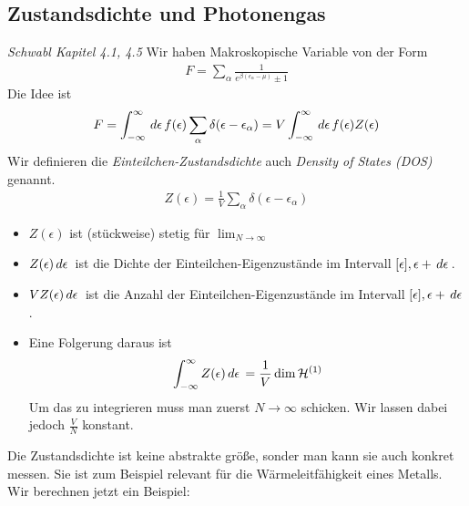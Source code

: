 \subsection*{Zustandsdichte und Photonengas}
\emph{Schwabl Kapitel 4.1, 4.5}
Wir haben Makroskopische Variable von der Form
%
\begin{align*}
  F = \sum_{\alpha}^{} 
  \frac{1}{e^{\beta(\epsilon_\alpha - \mu)} \pm 1}
\end{align*}
%
Die Idee ist
%
\begin{align*}
  F= \int_{-\infty}^{\infty} \,d\epsilon\, f(\epsilon) \sum_{\alpha}^{}
  \delta (\epsilon-\epsilon_\alpha) = 
  V \int_{-\infty}^{\infty} \,d\epsilon\,f(\epsilon) Z(\epsilon)
\end{align*}
%
Wir definieren die \emph{Einteilchen-Zustandsdichte}
auch \emph{Density of States (DOS)} genannt.
%
\begin{align*}
  Z(\epsilon) = \frac{1}{V} \sum_{\alpha}^{} \delta (\epsilon-\epsilon_\alpha)
\end{align*}
%
\begin{itemize}
  \item $Z(\epsilon)$ ist (stückweise) stetig für $ \lim_{N\to \infty}$
  \item $Z(\epsilon) \,d\epsilon\,$ ist die Dichte der Einteilchen-Eigenzustände
    im Intervall $[\epsilon], \epsilon + \,d\epsilon\,$.
  \item $V Z(\epsilon) \,d\epsilon\,$ ist die Anzahl der Einteilchen-Eigenzustände
    im Intervall $[\epsilon], \epsilon + \,d\epsilon\,$.
  \item Eine Folgerung daraus ist
    \begin{align*}
      \int_{-\infty}^{\infty} Z(\epsilon) \,d\epsilon\, = \frac{1}{V}
      \operatorname{dim} \mathcal{H}^{(1)}
    \end{align*}
    Um das zu integrieren muss man zuerst $N\to\infty$ schicken. Wir lassen 
    dabei jedoch $\frac{V}{N}$ konstant.
\end{itemize}
Die Zustandsdichte ist keine abstrakte größe, sonder man kann sie auch konkret
messen. Sie ist zum Beispiel relevant für die Wärmeleitfähigkeit eines Metalls.
Wir berechnen jetzt ein Beispiel:
